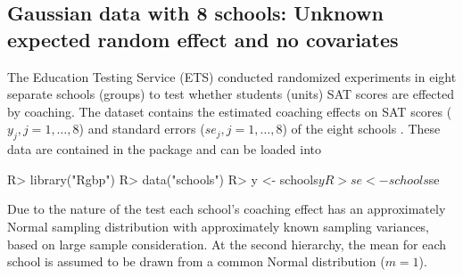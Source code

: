 \documentclass[article]{jss}
\begin{document}



\subsection[Unknown Second-level Mean and No Covariate]{Gaussian data with 8 schools: Unknown expected random effect and no covariates} \label{sec:ex:8schools}

The Education Testing Service (ETS) conducted randomized experiments in eight
separate schools (groups) to test whether students (units) SAT scores are
effected by coaching. The dataset contains the estimated coaching effects on SAT
scores ($y_{j}, j=1, \ldots, 8$) and standard errors ($se_{j}, j=1, \ldots, 8$)
of the eight schools \citep{1981}. These data are contained in the package and can be loaded into 
\begin{CodeChunk}
\begin{CodeInput}
R> library("Rgbp")
R> data("schools")
R> y  <- schools$y
R> se <- schools$se
\end{CodeInput}
\end{CodeChunk}


Due to the nature of the test each school's coaching effect has an approximately Normal sampling distribution with approximately known sampling variances, based on large sample consideration.  At the second hierarchy, the mean for each school is assumed to be drawn from a common Normal distribution ($m=1$).
\end{document}
